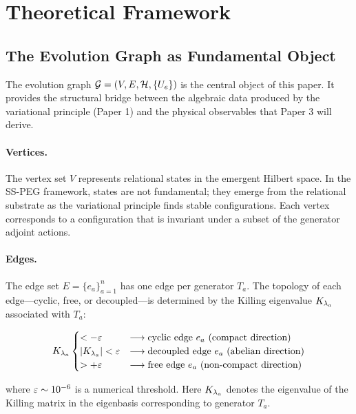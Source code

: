 \section{Theoretical Framework}\label{sec:theoretical_framework}

\subsection{The Evolution Graph as Fundamental Object}\label{sec:evolution_graph_detail}

The evolution graph $\mathcal{G} = (V, E, \mathcal{H}, \{U_e\})$ is the central object of this paper. It provides the structural bridge between the algebraic data produced by the variational principle (Paper 1) and the physical observables that Paper 3 will derive.

\paragraph{Vertices.} The vertex set $V$ represents relational states in the emergent Hilbert space. In the SS-PEG framework, states are not fundamental; they emerge from the relational substrate as the variational principle finds stable configurations. Each vertex corresponds to a configuration that is invariant under a subset of the generator adjoint actions.

\paragraph{Edges.} The edge set $E = \{e_a\}_{a=1}^n$ has one edge per generator $T_a$. The topology of each edge---cyclic, free, or decoupled---is determined by the Killing eigenvalue $K_{\lambda_a}$ associated with $T_a$:

\begin{equation}
K_{\lambda_a} \begin{cases}
< -\varepsilon & \longrightarrow \text{cyclic edge } e_a \text{ (compact direction)} \\
| K_{\lambda_a} | < \varepsilon & \longrightarrow \text{decoupled edge } e_a \text{ (abelian direction)} \\
> +\varepsilon & \longrightarrow \text{free edge } e_a \text{ (non-compact direction)}
\end{cases}
\end{equation}

where $\varepsilon \sim 10^{-6}$ is a numerical threshold. Here $K_{\lambda_a}$ denotes the eigenvalue of the Killing matrix in the eigenbasis corresponding to generator $T_a$.

